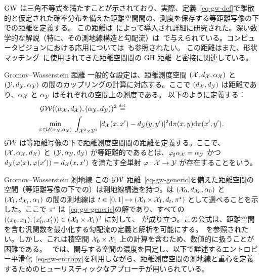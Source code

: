 $\operatorname{\mathrm{GW}}$ は三角不等式を満たすことが示されており、実際、定義~\eqref{eq-gw-def}で離散的と仮定された確率分布を備えた距離空間間の、測度を保存する等距離写像の下での距離を定義する。
この距離は~\citet{memoli-2011}によって導入され詳細に研究された。深い数学的な解説（特に、その測地線構造と勾配流）は~\citep{SturmGW}で与えられている。コンピュータビジョンにおける応用については~\citep{schmitzer2013modelling}も参照されたい。
この距離はまた、形状マッチング~\citep{memoli-2007,bronstein-2010}に使用されてきた距離空間間の GH 距離~\citep{gromov-2001}と密接に関連している。



\begin{rem2}{Gromov--Wasserstein 距離}
	一般的な設定は、距離測度空間 $(\mathcal{X},d_{\mathcal{X}},\alpha_{\mathcal{X}})$ と $(\mathcal{Y},d_{\mathcal{Y}},\alpha_{\mathcal{Y}})$ の間のカップリングの計算に対応する。ここで $(d_{\mathcal{X}},d_{\mathcal{Y}})$ は距離であり、$\alpha_{\mathcal{X}}$ と $\alpha_{\mathcal{Y}}$ はそれぞれの空間上の測度である。
	以下のように定義する：
	\begin{equation}
		\label{eq-gw-generic}
		\begin{split}
		&\operatorname{\mathcal{GW}}( (\alpha_{\mathcal{X}},d_{\mathcal{X}}), (\alpha_{\mathcal{Y}},d_{\mathcal{Y}}) )^2 \stackrel{\mbox{\upshape\tiny def.}}{=} \\
		&\underset{ \pi \in \mathcal{U}(\alpha_{\mathcal{X}},\alpha_{\mathcal{Y}}) }{\min}\;
		\int_{\mathcal{X}^2 \times \mathcal{Y}^2}
		| d_{\mathcal{X}}(x,x')-d_{\mathcal{Y}}(y,y') |^2
		\mathrm{d}\pi(x,y)\mathrm{d}\pi(x',y').
		\end{split}
	\end{equation}
	$\operatorname{\mathcal{GW}}$ は等距離写像の下で距離測度空間間の距離を定義する。ここで、$(\mathcal{X},\alpha_{\mathcal{X}},d_{\mathcal{X}})$ と $(\mathcal{Y},\alpha_{\mathcal{Y}},d_{\mathcal{Y}})$ が等距離的であるとは、$\varphi_{\sharp}\alpha_{\mathcal{X}}=\alpha_{\mathcal{Y}}$ かつ $d_{\mathcal{Y}}(\varphi(x),\varphi(x'))=d_{\mathcal{X}}(x,x')$ を満たす全単射 $\varphi : \mathcal{X} \rightarrow \mathcal{Y}$ が存在することをいう。
\end{rem2}



\begin{rem2}{Gromov--Wasserstein 測地線}\label{rem-geod-gw}
この $\operatorname{\mathcal{GW}}$ 距離~\eqref{eq-gw-generic}を備えた距離空間の空間（等距離写像の下での）は測地線構造を持つ。\citet{SturmGW}は $(\mathcal{X}_0,d_{\mathcal{X}_0},\alpha_0)$ と $(\mathcal{X}_1,d_{\mathcal{X}_1},\alpha_1)$ の間の測地線は $t \in [0,1] \mapsto (\mathcal{X}_0 \times \mathcal{X}_1,d_t,\pi^\star)$ として選べることを示した。ここで $\pi^\star$ は~\eqref{eq-gw-generic}の解であり、すべての $((x_0,x_1), (x_0',x_1')) \in (\mathcal{X}_0 \times \mathcal{X}_1)^2$ に対して、
が成り立つ。この公式は、距離空間を含む汎関数を最小化する勾配流の定義と解析を可能にする。~\citet{SturmGW}を参照されたい。しかし、これは積空間 $\mathcal{X}_0 \times \mathcal{X}_1$ 上の計算を含むため、数値的に扱うことが困難である。
~\citep{peyre2016gromov}では、関与する空間の濃度を固定し、以下で詳述するエントロピー平滑化~\eqref{eq-gw-entropy}を利用しながら、距離測度空間の測地線と重心を定義するためのヒューリスティックなアプローチが用いられている。
\end{rem2}



